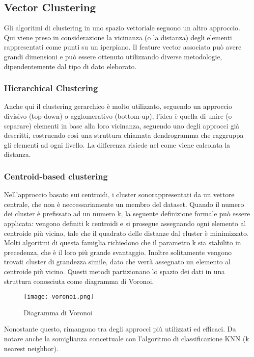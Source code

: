 \subsection{Vector Clustering}
Gli algoritmi di clustering in uno spazio vettoriale seguono un altro approccio. Qui viene preso in considerazione la vicinanza (o la distanza) degli elementi rappresentati come punti su un iperpiano. Il feature vector associato può avere grandi dimensioni e può essere ottenuto utilizzando diverse metodologie, dipendentemente dal tipo di dato eleborato. 

\subsubsection{Hierarchical Clustering}
Anche qui il clustering gerarchico è molto utilizzato, seguendo un approccio divisivo (top-down) o agglomerativo (bottom-up), l’idea è quella di unire (o separare) elementi in base alla loro vicinanza, seguendo uno degli approcci già descritti, costruendo così una struttura chiamata dendrogramma che raggruppa gli elementi ad ogni livello. La differenza risiede nel come viene calcolata la distanza.

\subsubsection{Centroid-based clustering}
Nell’approccio basato sui centroidi, i cluster sonorappresentati da un vettore centrale, che non è neccessariamente un membro del dataset. Quando il numero dei cluster è prefissato ad un numero k, la seguente definizione formale può essere applicata: vengono definiti k centroidi e si prosegue assegnando ogni elemento al centroide più vicino, tale che il quadrato delle distanze dal cluster è minimizzato. Molti algoritmi di questa famiglia richiedono che il parametro k sia stabilito in precedenza, che è il loro più grande svantaggio. Inoltre solitamente vengono trovati cluster di grandezza simile, dato che verrà assegnato un elemento al centroide più vicino. Questi metodi partizionano lo spazio dei dati in una struttura conosciuta come diagramma di Voronoi.
\begin{figure}[htb]
	\centering
	\texttt{[image: voronoi.png]}
	\caption{Diagramma di Voronoi}
	\label{voronoi}
\end{figure}
Nonostante questo, rimangono tra degli approcci più utilizzati ed efficaci. Da notare anche la somiglianza concettuale con l’algoritmo di classificazione KNN (k nearest neighbor).


